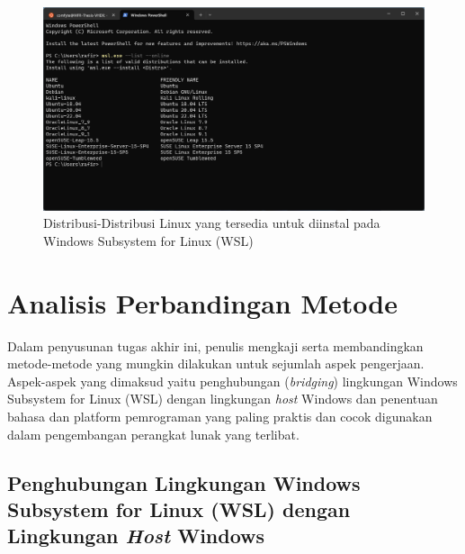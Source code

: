 \begin{figure}
    \centering
    \includegraphics[width=1\linewidth]{assets/Screenshot 2024-01-02 233751.png}
    \caption{Distribusi-Distribusi Linux yang tersedia untuk diinstal pada Windows Subsystem for Linux (WSL)}
    \label{wsl-distro-list}
\end{figure}

\section{Analisis Perbandingan Metode}

Dalam penyusunan tugas akhir ini, penulis mengkaji serta membandingkan metode-metode yang mungkin dilakukan untuk sejumlah aspek pengerjaan. Aspek-aspek yang dimaksud yaitu penghubungan (\textit{bridging}) lingkungan Windows Subsystem for Linux (WSL) dengan lingkungan \textit{host} Windows dan penentuan bahasa dan platform pemrograman yang paling praktis dan cocok digunakan dalam pengembangan perangkat lunak yang terlibat.

\subsection{Penghubungan Lingkungan Windows Subsystem for Linux (WSL) dengan Lingkungan \textit{Host} Windows}

